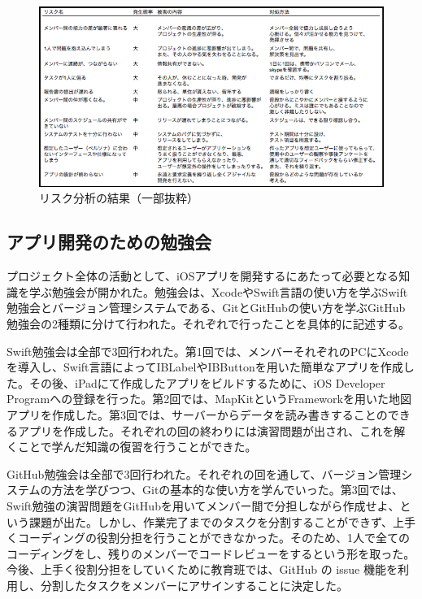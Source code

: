\documentclass[openany,11pt,papersize]{jsbook}
\begin{document}
\begin{figure}[H]
\begin{center}
\includegraphics[width=14cm, bb=0 0 753 394]{img/RiskManagement.png}
\end{center}
\caption{リスク分析の結果（一部抜粋）}
\end{figure}


\subsection{アプリ開発のための勉強会}
\par プロジェクト全体の活動として、iOSアプリを開発するにあたって必要となる知識を学ぶ勉強会が開かれた。勉強会は、XcodeやSwift言語の使い方を学ぶSwift勉強会とバージョン管理システムである、GitとGitHubの使い方を学ぶGitHub勉強会の2種類に分けて行われた。それぞれで行ったことを具体的に記述する。
\par Swift勉強会は全部で3回行われた。第1回では、メンバーそれぞれのPCにXcodeを導入し、Swift言語によってIBLabelやIBButtonを用いた簡単なアプリを作成した。その後、iPadにて作成したアプリをビルドするために、iOS Developer Programへの登録を行った。第2回では、MapKitというFrameworkを用いた地図アプリを作成した。第3回では、サーバーからデータを読み書きすることのできるアプリを作成した。それぞれの回の終わりには演習問題が出され、これを解くことで学んだ知識の復習を行うことができた。
\par GitHub勉強会は全部で3回行われた。それぞれの回を通して、バージョン管理システムの方法を学びつつ、Gitの基本的な使い方を学んでいった。第3回では、Swift勉強の演習問題をGitHubを用いてメンバー間で分担しながら作成せよ、という課題が出た。しかし、作業完了までのタスクを分割することができず、上手くコーディングの役割分担を行うことができなかった。そのため、1人で全てのコーディングをし、残りのメンバーでコードレビューをするという形を取った。今後、上手く役割分担をしていくために教育班では、GitHub の issue 機能を利用し、分割したタスクをメンバーにアサインすることに決定した。
\end{document}

